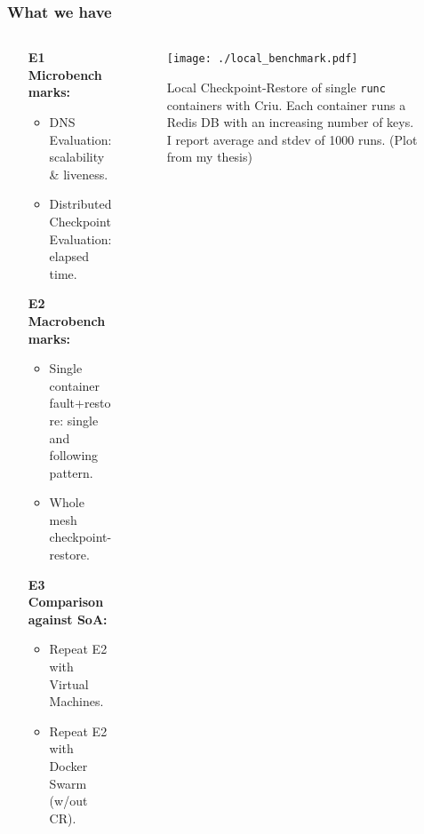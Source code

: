\documentclass[9pt,    %
    english,            %
    xcolor=table,       %
    envcountsect,        %
    aspectratio=169     %
]{beamer}
\begin{document}
\begin{frame}
    \frametitle{What we have}
    
    \begin{columns}[t]
        \begin{column}{.4\textwidth}
            \begin{enumerate}
                \item[\textbf{E1}] \textbf{Microbenchmarks:}
                \begin{itemize}
                    \item DNS Evaluation: scalability \& liveness.
                    \item Distributed Checkpoint Evaluation: elapsed time.
                \end{itemize}
                \item[\textbf{E2}] \textbf{Macrobenchmarks:}
                \begin{itemize}
                    \item Single container fault+restore: single and following pattern.
                    \item Whole mesh checkpoint-restore.
                \end{itemize}
                \item[\textbf{E3}] \textbf{Comparison against SoA:}
                \begin{itemize}
                    \item Repeat E2 with Virtual Machines.
                    \item Repeat E2 with Docker Swarm (w/out CR).
                \end{itemize}
            \end{enumerate}
        \end{column} \hfill
        \begin{column}{.6\textwidth}
            \begin{figure}[h!]
                \centering
                \texttt{[image: ./local\_benchmark.pdf]}
                \caption{Local Checkpoint-Restore of single \texttt{runc} containers with Criu. Each container runs a Redis DB with an increasing number of keys. I report average and stdev  of 1000 runs. (Plot from my thesis)}
            \end{figure}
        \end{column}
    \end{columns}

\end{frame}
\end{document}

